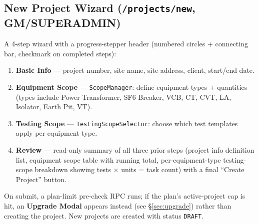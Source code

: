 \documentclass[11pt]{article}
\begin{document}
\subsection{New Project Wizard (\texttt{/projects/new}, GM/SUPERADMIN)}
A 4-step wizard with a progress-stepper header (numbered circles + connecting bar, checkmark on
completed steps):
\begin{enumerate}[nosep]
  \item \textbf{Basic Info} --- project number, site name, site address, client, start/end date.
  \item \textbf{Equipment Scope} --- \texttt{ScopeManager}: define equipment types + quantities
    (types include Power Transformer, SF6 Breaker, VCB, CT, CVT, LA, Isolator, Earth Pit, VT).
  \item \textbf{Testing Scope} --- \texttt{TestingScopeSelector}: choose which test templates apply
    per equipment type.
  \item \textbf{Review} --- read-only summary of all three prior steps (project info definition
    list, equipment scope table with running total, per-equipment-type testing-scope breakdown
    showing tests $\times$ units = task count) with a final ``Create Project'' button.
\end{enumerate}
On submit, a plan-limit pre-check RPC runs; if the plan's active-project cap is hit, an
\textbf{Upgrade Modal} appears instead (see \S\ref{sec:upgrade}) rather than creating the project.
New projects are created with status \texttt{DRAFT}.
\end{document}

